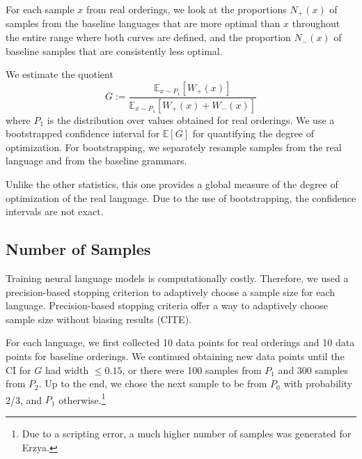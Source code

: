\documentclass[11pt,letterpaper]{article}
\newcommand{\E}[0]{\mathbb{E}}
\begin{document}
For each sample $x$ from real orderings, we look at the proportions $N_+(x)$ of samples from the baseline languages that are more optimal than $x$ throughout the entire range where both curves are defined, and the proportion $N_-(x)$ of baseline samples that are consistently less optimal.


We estimate the quotient
\begin{equation}\label{eq:g}
	G :=	\frac{\E_{x \sim P_1}[W_+(x)]}{\E_{x \sim P_1}[W_+(x) + W_-(x)]}
\end{equation}
where $P_1$ is the distribution over values obtained for real orderings.
We use a bootstrapped confidence interval for $\E[G]$ for quantifying the degree of optimization.
For bootstrapping, we separately resample samples from the real language and from the baseline grammars.

Unlike the other statistics, this one provides a global measure of the degree of optimization of the real language.
Due to the use of bootstrapping, the confidence intervals are not exact.


%



\subsection{Number of Samples}
Training neural language models is computationally costly.
Therefore, we used a precision-based stopping criterion to adaptively choose a sample size for each language.
Precision-based stopping criteria offer a way to adaptively choose sample size without biasing results (CITE).

For each language, we first collected 10 data points for real orderings and 10 data points for baseline orderings.
We continued obtaining new data points until the CI for $G$ had width $\leq 0.15$, or there were 100 samples from $P_1$ and 300 samples from $P_2$.
Up to the end, we chose the next sample to be from $P_0$ with probability 2/3, and $P_1$ otherwise.\footnote{Due to a scripting error, a much higher number of samples was generated for Erzya.}
\end{document}
